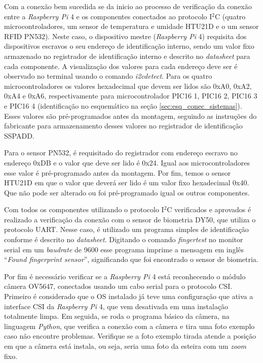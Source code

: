 Com a conexão bem sucedida se da inicio ao processo de verificação da conexão entre a \textit{Raspberry Pi} 4 e os componentes conectados ao protocolo I$^2$C (quatro microcontroladores, um sensor de temperatura e umidade HTU21D e o um sensor RFID PN532). Neste caso, o dispositivo mestre (\textit{Raspberry Pi} 4) requisita dos dispositivos escravos o seu endereço de identificação interno, sendo um valor fixo armazenado no registrador de identificação interno e descrito no \textit{datasheet} para cada componente. A visualização dos valores para cada endereço deve ser é observado no terminal usando o comando \textit{i2cdetect}. 
Para os quatro microcontroladores os valores hexadecimal que devem ser lidos são 0xA0, 0xA2, 0xA4 e 0xA6, respectivamente para microcontrolador PIC16 1, PIC16 2, PIC16 3  e PIC16 4 (identificação no esquemático na seção \ref{sec:esq_conec_sistemas}). Esses valores são pré-programados antes da montagem, seguindo as instruções do fabricante para armazenamento desses valores no registrador de identificação SSPADD. 

Para o sensor PN532, é requisitado do registrador com endereço escravo no endereço 0xDB e o valor que deve ser lido é 0x24. Igual aos microcontroladores esse valor é pré-programado antes da montagem. Por fim, temos o sensor HTU21D em que o valor que deverá ser lido é um valor fixo hexadecimal 0x40. Que não pode ser alterado ou foi pré-programado igual os outros componentes.

Com todos os componentes utilizando o protocolo I$^2$C verificados e aprovados é realizado a verificação da conexão com o sensor de biometria DY50, que utiliza o protocolo UART. Nesse caso, é utilizado um programa simples de identificação conforme é descrito no \textit{datasheet}. Digitando o comando \textit{fingertest} no monitor serial em um \textit{baudrate} de 9600 esse programa imprime a mensagem em inglês ``\textit{Found fingerprint sensor}'', significando que foi encontrado o sensor de biometria. 

Por fim é necessário verificar se a \textit{Raspberry Pi} 4 está reconhecendo o módulo câmera OV5647, conectados usando um cabo serial para o protocolo CSI. Primeiro é considerado que o OS instalado já teve uma configuração que ativa a interface CSI da \textit{Raspberry Pi} 4, que vem desativada em uma instalação totalmente limpa. Em seguida, se roda o programa básico da câmera, na linguagem \textit{Python}, que verifica a conexão com a câmera e tira uma foto exemplo caso não encontre problemas. Verifique se a foto exemplo tirada atende a posição em que a câmera está instala, ou seja, seria uma foto da esteira com um \textit{zoom} fixo.

